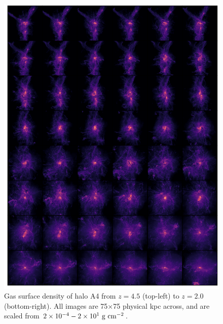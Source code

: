 \begin{figure}
    \centering
    \includegraphics[width=\textwidth,keepaspectratio]{figures/rogues_gas.png}
    \caption{
        Gas surface density of halo A4 from $z=4.5$ (top-left) to $z=2.0$ (bottom-right).
        All images are 75$\times$75 physical kpc across, and are scaled from $2\times10^{-4}-2\times10^{1}\ \rm{g}\ \rm{cm}^{-2}$.
    }
  \label{fig:A4gas}
\end{figure}

